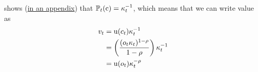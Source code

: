 \documentclass{scrartcl}
\begin{document}
\cite{BufferStockTheory} shows (\href{https://www.econ2.jhu.edu/people/ccarroll/papers/BufferStockTheory/#MPCnvrsIsCPDV}{in an appendix}) that ${\mathbb{P}}_{t}(\mathrm{c}) = \kappa_{t}^{-1}$, which means that we can write value as
\begin{equation}\begin{gathered}\begin{aligned}
  v_{t} & =  \mathrm{u}(c_{t})\kappa^{-1}_{t}
  \\ & =  \left(\frac{(o_{t}\kappa_{t})^{1-\rho}}{1-\rho}\right)\kappa_{t}^{-1}
\\ & =  \mathrm{u}(o_{t})\kappa_{t}^{-\rho}           
\end{aligned}\end{gathered}\end{equation}



\end{document}
